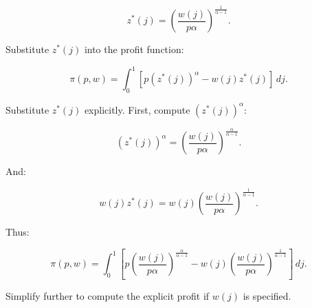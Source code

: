 \documentclass{article}
\begin{document}
\[
z^*(j) = \left( \frac{w(j)}{p \alpha} \right)^{\frac{1}{\alpha - 1}}.
\]

Substitute \( z^*(j) \) into the profit function:

\[
\pi(p, w) = \int_0^1 \left[ p \left( z^*(j) \right)^\alpha - w(j) z^*(j) \right] \, dj.
\]

Substitute \( z^*(j) \) explicitly. First, compute \( \left( z^*(j) \right)^\alpha \):

\[
\left( z^*(j) \right)^\alpha = \left( \frac{w(j)}{p \alpha} \right)^{\frac{\alpha}{\alpha - 1}}.
\]

And:

\[
w(j) z^*(j) = w(j) \left( \frac{w(j)}{p \alpha} \right)^{\frac{1}{\alpha - 1}}.
\]

Thus:

\[
\pi(p, w) = \int_0^1 \left[ p \left( \frac{w(j)}{p \alpha} \right)^{\frac{\alpha}{\alpha - 1}} - w(j) \left( \frac{w(j)}{p \alpha} \right)^{\frac{1}{\alpha - 1}} \right] \, dj.
\]

Simplify further to compute the explicit profit if \( w(j) \) is specified.
\end{document}

